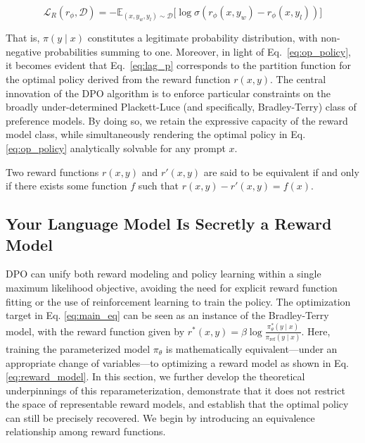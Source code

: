 \begin{equation}\label{eq:reward_model}
    \mathcal{L}_R(r_{\phi}, \mathcal{D}) = -\mathbb{E}_{(x, y_w, y_l)\sim \mathcal{D}}\bigl[\log \sigma(r_{\phi}(x, y_w)- r_{\phi}(x, y_l))\bigr]
\end{equation}

That is, $\pi(y\mid x)$ constitutes a legitimate probability distribution, with non-negative probabilities summing to one. Moreover, in light of Eq.~\ref{eq:op_policy}, it becomes evident that Eq.~\ref{eq:lag_p} corresponds to the partition function for the optimal policy derived from the reward function $r(x, y)$. The central innovation of the DPO algorithm is to enforce particular constraints on the broadly under-determined Plackett-Luce (and specifically, Bradley-Terry) class of preference models. By doing so, we retain the expressive capacity of the reward model class, while simultaneously rendering the optimal policy in Eq. \ref{eq:op_policy} analytically solvable for any prompt $x$.

\begin{definition}
Two reward functions $r(x, y)$ and $r'(x, y)$ are said to be equivalent if and only if there exists some function $f$ such that $r(x, y) - r'(x, y) = f(x)$.     
\end{definition}

\subsection{Your Language Model Is Secretly a Reward Model} DPO can unify both reward modeling and policy learning within a single maximum likelihood objective, avoiding the need for explicit reward function fitting or the use of reinforcement learning to train the policy. The optimization target in Eq. \ref{eq:main_eq} can be seen as an instance of the Bradley-Terry model, with the reward function given by $r^*(x, y) = \beta \log\frac{\pi^*_\theta(y \mid x)}{\pi_\text{ref}(y \mid x)}$. Here, training the parameterized model $\pi_{\theta}$ is mathematically equivalent—under an appropriate change of variables—to optimizing a reward model as shown in Eq. \ref{eq:reward_model}. In this section, we further develop the theoretical underpinnings of this reparameterization, demonstrate that it does not restrict the space of representable reward models, and establish that the optimal policy can still be precisely recovered. We begin by introducing an equivalence relationship among reward functions.

\label{sec:theory}

